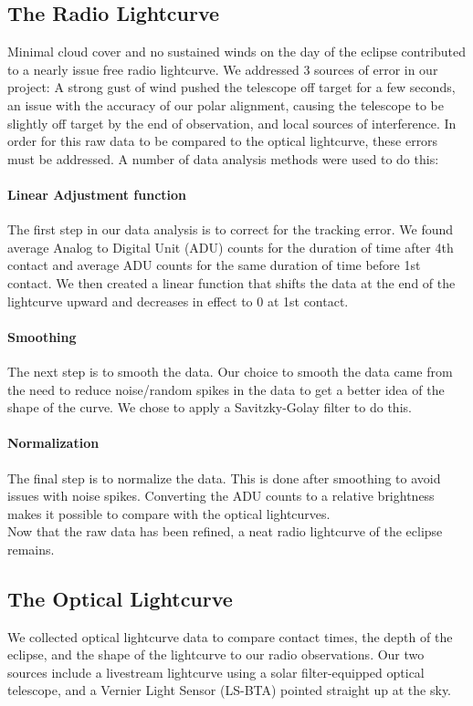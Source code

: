\subsection{\label{sec:radio}The Radio Lightcurve}
Minimal cloud cover and no sustained winds on the day of the eclipse contributed to a nearly issue free radio lightcurve.
We addressed 3 sources of error in our project: A strong gust of wind pushed the telescope off target for a few seconds, an issue with the accuracy of our polar alignment, causing the telescope to be slightly off target by the end of observation, and local sources of interference.
In order for this raw data to be compared to the optical lightcurve, these errors must be addressed.
A number of data analysis methods were used to do this:
\paragraph{Linear Adjustment function}
The first step in our data analysis is to correct for the tracking error.
We found average Analog to Digital Unit (ADU) counts for the duration of time after 4th contact and average ADU counts for the same duration of time before 1st contact.
We then created a linear function that shifts the data at the end of the lightcurve upward and decreases in effect to 0 at 1st contact.
\paragraph{Smoothing}
The next step is to smooth the data.
Our choice to smooth the data came from the need to reduce noise/random spikes in the data to get a better idea of the shape of the curve.
We chose to apply a Savitzky-Golay filter to do this.
\paragraph{Normalization}
The final step is to normalize the data.
This is done after smoothing to avoid issues with noise spikes.
Converting the ADU counts to a relative brightness makes it possible to compare with the optical lightcurves.
\\
Now that the raw data has been refined, a neat radio lightcurve of the eclipse remains.
\subsection{\label{sec:optical}The Optical Lightcurve}
We collected optical lightcurve data to compare contact times, the depth of the eclipse, and the shape of the lightcurve to our radio observations. Our two sources include a livestream lightcurve using a solar filter-equipped optical telescope, and a Vernier Light Sensor (LS-BTA) pointed straight up at the sky.
